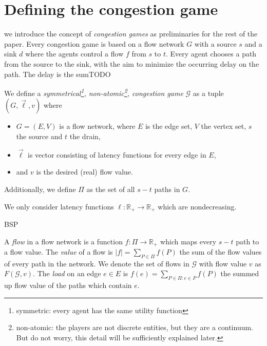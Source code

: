 \section{Defining the congestion game}
\newcommand{\tupel}[1]{\left(#1\right)}
 we introduce the concept of \emph{congestion games} as preliminaries for the rest of the paper.
Every congestion game is based on a flow network $G$ with a source $s$ and a sink $d$ where the agents control a flow $f$ from $s$ to $t$.
Every agent chooses a path from the source to the sink, with the aim to minimize the occurring delay on the path.
The delay is the sumTODO

\begin{definition}
	We define a \emph{symmetrical\footnote{symmetric: every agent has the same utility function}, non-atomic\footnote{non-atomic: the players are not discrete entities, but they are a continuum. But do not worry, this detail will be sufficiently explained later.}, congestion game} $\mathcal G$ as a tuple $(G, \vec{\ell}, v)$ where
	\begin{itemize}
		\item $G = (E, V)$ is a flow network, where $E$ is the edge set, $V$ the vertex set, $s$ the source and $t$ the drain,
		\item $\vec{\ell}$ is vector consisting of latency functions for every edge in $E$,
		\item and $v$ is the desired (real) flow value.
	\end{itemize}
	Additionally, we define $\Pi$ as the set of all $s-t$ paths in $G$.
\end{definition}

\begin{remark}
	We only consider latency functions $\ell \colon \mathbb R_+ \to \mathbb R_+$ which are nondecreasing.
\end{remark} 

BSP
\begin{definition}[Flow]
	A \emph{flow} in a flow network is a function $f \colon \Pi \to \mathbb R_+$ which maps every $s-t$ path to a flow value.
	The \emph{value} of a flow is $|f| = \sum_{P \in \Pi} f(P)$ the sum of the flow values of every path in the network.
	We denote the set of flows in $\mathcal G$ with flow value $v$ as $F(\mathcal G, v)$.
	The \emph{load} on an edge $e \in E$ is $f(e) = \sum_{P \in \Pi \colon e \in P} f(P)$ the summed up flow value of the paths which contain $e$.
\end{definition}



